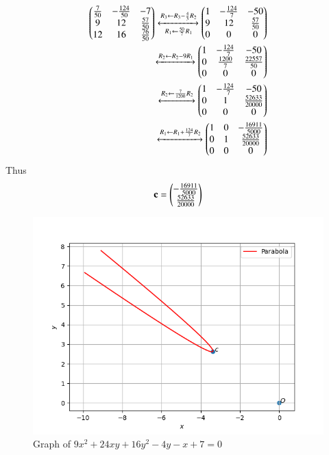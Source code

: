\begin{align*}
    \begin{pmatrix}\frac{7}{50}&-\frac{124}{50}&-7\\9&12&\frac{57}{50}\\12&16&\frac{76}{50}\end{pmatrix}\xleftrightarrow[R_1\leftarrow \frac{50}{7}R_1]{R_3\leftarrow R_3-\frac{4}{3}R_2}\begin{pmatrix}1&-\frac{124}{7}&-50\\9&12&\frac{57}{50}\\0&0&0\end{pmatrix}\\
    \xleftrightarrow{R_2\leftarrow R_2-9R_1}\begin{pmatrix}1&-\frac{124}{7}&-50\\0&\frac{1200}{7}&\frac{22557}{50}\\0&0&0\end{pmatrix}\\
    \xleftrightarrow{R_2\leftarrow\frac{7}{1200}R_2}\begin{pmatrix}1&-\frac{124}{7}&-50\\0&1&\frac{52633}{20000}\\0&0&0\end{pmatrix}\\
    \xleftrightarrow{R_1\leftarrow R_1+\frac{124}{7}R_2}\begin{pmatrix}1&0&-\frac{16911}{5000}\\0&1&\frac{52633}{20000}\\0&0&0\end{pmatrix}
\end{align*}
Thus
\begin{align}
    \mathbf{c} = \begin{pmatrix}-\frac{16911}{5000}\\\frac{52633}{20000}\end{pmatrix}
\end{align}
  \begin{figure}[!ht]
        \centering
        \includegraphics[width=\columnwidth]{./solutions/41/6/parab.png}
        \caption{Graph of $9x^2+24xy+16y^2-4y-x+7=0$}
        \label{eq:solutions/41/6/myfig}
\end{figure}
